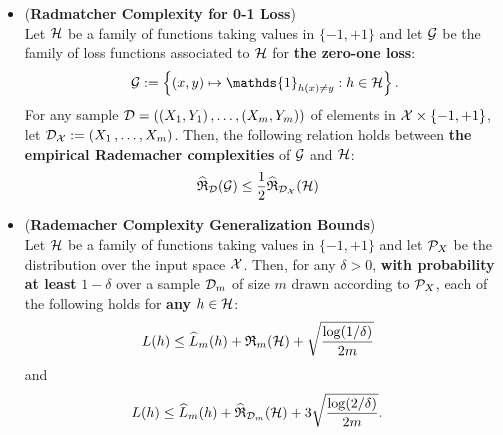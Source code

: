\documentclass[11pt]{article}
\begin{document}
\begin{itemize}
\item \begin{lemma} (\textbf{Radmatcher Complexity for 0-1 Loss}) \citep{mohri2018foundations}\\
Let ${\mathcal H}$ be a family of functions taking values in $\{-1, +1\}$ and let ${\mathcal G}$ be the family of loss functions associated to ${\mathcal H}$ for \textbf{the zero-one loss}: 
\begin{align*}
\cG := \set{(x,y) \mapsto \mathds{1}_{h(x) \neq y}:  h \in \cH}.
\end{align*}
For any sample ${\mathcal D} = ((X_1, Y_1) \,{,}\ldots{,}\, (X_m, Y_m))$ of elements in ${\mathcal X} \times \{-1, +1\}$, let ${\mathcal D}_{{\mathcal X}} := (X_1 \,{,}\ldots{,}\, X_m)$. Then, the following relation holds between \textbf{the empirical Rademacher complexities} of ${\mathcal G}$ and ${\mathcal H}$:
\begin{align*}
\widehat{{\mathfrak R}}_{{\mathcal D}}({\mathcal G}) &\le \frac{1}{2}\widehat{{\mathfrak R}}_{{\mathcal D}_{{\mathcal X}}}({\mathcal H})
\end{align*}
\end{lemma}

\item \begin{proposition} \label{prop: generalization_bound_radmatcher} (\textbf{Rademacher Complexity Generalization Bounds})\citep{mohri2018foundations}\\
Let ${\mathcal H}$ be a family of functions taking values in $\{-1, +1\}$  and let ${\mathcal P}_{X}$ be the distribution over the input space ${\mathcal X}$. Then, for any $\delta > 0$, \textbf{with probability at least} $1 - \delta$ over a sample ${\mathcal D}_{m}$ of size $m$ drawn according to ${\mathcal P}_{X}$, each of the following holds for \textbf{any} $h \in {\mathcal H}$:
\begin{align}
L(h) &\le \widehat{L}_{m}(h) + {\mathfrak R}_{m}({\mathcal H}) + \sqrt{\frac{\log(1 / \delta)}{2m}}  \label{eqn: radmatcher_binary_loss_bound_1}
\end{align} and
\begin{align}
L(h) &\le \widehat{L}_{m}(h) + \widehat{{\mathfrak R}}_{{\mathcal D}_{m}}({\mathcal H}) +  3\sqrt{\frac{\log(2 / \delta)}{2m}}.  \label{eqn: radmatcher_binary_loss_bound_2}
\end{align}
\end{proposition}


\end{itemize}
\end{document}
